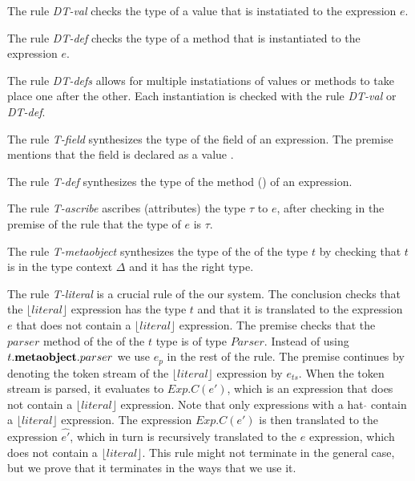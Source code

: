 The rule \textit{DT-val} checks the type of a value that is instatiated to the expression $e$.

The rule \textit{DT-def} checks the type of a method  that is instantiated to the expression $e$.

The rule \textit{DT-defs} allows for multiple instatiations of values or methods to take place one after the other. Each instantiation is checked with the rule \textit{DT-val} or \textit{DT-def}.

The rule \textit{T-field} synthesizes the type of the field of an expression. The premise mentions that the field is declared as a value .

The rule \textit{T-def}  synthesizes the type of the method () of an expression. 

The rule \textit{T-ascribe} ascribes (attributes) the type $\tau$ to $e$, after checking in the premise of the rule that the type of $e$ is $\tau$.

The rule \textit{T-metaobject} synthesizes the type of the  of the type $t$ by checking that $t$ is in the type context $\Delta$ and it has the right type.

The rule \textit{T-literal} is a crucial rule of the our system. The conclusion checks that the $\lfloor literal \rfloor$ expression has the type $t$ and that it is translated to the expression $e$ that does not contain a $\lfloor literal \rfloor$ expression. The premise checks that the $parser$ method of the  of the $t$ type is of type $Parser$. Instead of using $t.\textbf{metaobject}.parser$ we use $e_p$ in the rest of the rule. The premise continues by denoting the token stream of the $\lfloor literal \rfloor$ expression by $e_{ts}$. When the token stream is parsed, it evaluates to $Exp.C(e')$, which is an expression that does not contain a $\lfloor literal \rfloor$ expression. Note that only expressions with a hat $\hat{}$ contain a $\lfloor literal \rfloor$ expression. The expression $Exp.C(e')$ is then translated to the expression $\hat{e'}$, which in turn is recursively translated to the $e$ expression, which does not contain a $\lfloor literal \rfloor$. This rule might not terminate in the general case, but we prove that it terminates in the ways that we use it.















